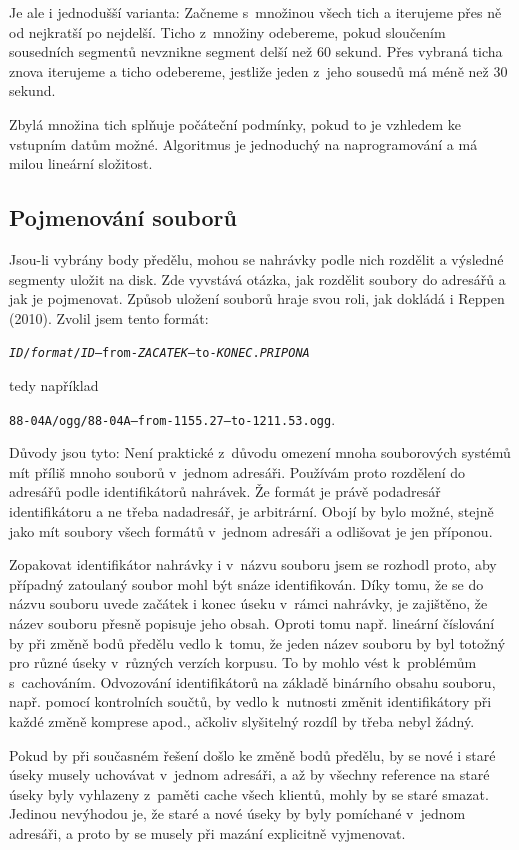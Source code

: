 Je ale i jednodušší varianta: Začneme s~množinou všech tich a iterujeme přes ně
od nejkratší po nejdelší. Ticho z~množiny odebereme, pokud sloučením sousedních
segmentů nevznikne segment delší než 60 sekund. Přes vybraná ticha znova
iterujeme a ticho odebereme, jestliže jeden z~jeho sousedů má méně než 30
sekund.

Zbylá množina tich splňuje počáteční podmínky, pokud to je vzhledem ke vstupním
datům možné. Algoritmus je jednoduchý na naprogramování a má milou
lineární složitost.

\subsection{Pojmenování souborů}

Jsou-li vybrány body předělu, mohou se nahrávky podle nich rozdělit a výsledné
segmenty uložit na disk. Zde vyvstává otázka, jak rozdělit soubory do adresářů a
jak je pojmenovat. Způsob uložení souborů hraje svou roli, jak dokládá i
Reppen (2010)\cite{reppen2010building}. Zvolil jsem tento formát:

\texttt{{\em{}ID}/{\em{}format}/{\em{}ID}--from-{\em{}ZACATEK}--to-{\em{}KONEC}.{\em{}PRIPONA}}

tedy například

\texttt{88-04A/ogg/88-04A--from-1155.27--to-1211.53.ogg}.

Důvody jsou tyto: Není praktické z~důvodu omezení mnoha souborových systémů mít
příliš mnoho souborů v~jednom adresáři. Používám proto rozdělení do adresářů podle
identifikátorů nahrávek. Že formát je právě podadresář identifikátoru a ne třeba
nadadresář, je arbitrární. Obojí by bylo možné, stejně jako mít soubory všech formátů
v~jednom adresáři a odlišovat je jen příponou.

Zopakovat identifikátor nahrávky i v~názvu souboru jsem se rozhodl proto, aby
případný zatoulaný soubor mohl být snáze identifikován. Díky tomu, že se do
názvu souboru uvede začátek i konec úseku v~rámci nahrávky, je zajištěno, že název
souboru přesně popisuje jeho obsah. Oproti tomu např. lineární číslování by při
změně bodů předělu vedlo k~tomu, že jeden název souboru by byl totožný pro různé
úseky v~různých verzích korpusu. To by mohlo vést k~problémům s~cachováním.
Odvozování identifikátorů na základě binárního obsahu souboru, např. pomocí
kontrolních součtů, by vedlo k~nutnosti změnit identifikátory při každé
změně komprese apod., ačkoliv slyšitelný rozdíl by třeba nebyl žádný.

Pokud by při současném řešení došlo ke změně bodů předělu, by se nové i staré úseky musely
uchovávat v~jednom adresáři, a až by všechny reference na staré úseky byly
vyhlazeny z~paměti cache všech klientů, mohly by se staré smazat. Jedinou
nevýhodou je, že staré a nové úseky by byly pomíchané v~jednom adresáři, a proto
by se musely při mazání explicitně vyjmenovat.

